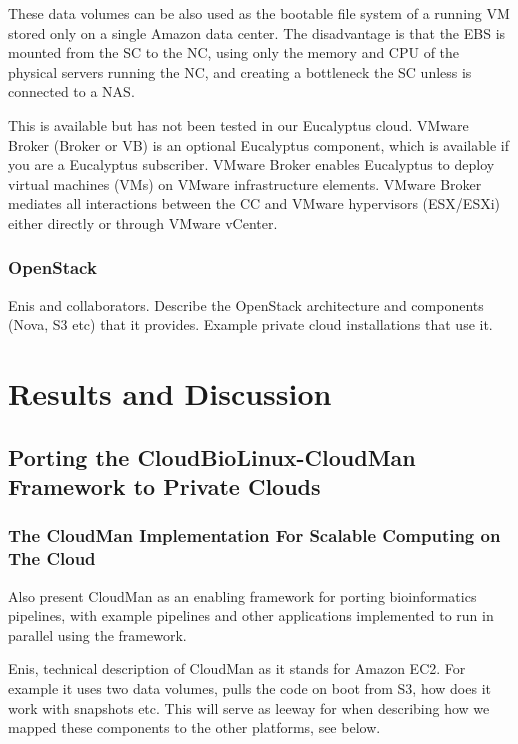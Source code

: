 \documentclass[10pt]{bmc_article}
\newenvironment{bmcformat}{\baselineskip20pt\sloppy\setboolean{publ}{false}}{\baselineskip20pt\sloppy}
\begin{document}
\begin{bmcformat}
These data volumes can be also used  as the bootable file system of a running VM stored only on a single Amazon data center. The 
disadvantage is that the EBS is mounted from the SC to the NC, using only the memory and CPU of the physical servers running the NC,
and creating a bottleneck the SC unless is connected to a NAS.




This is available but has not been tested in our Eucalyptus cloud.
VMware Broker (Broker or VB) is an optional Eucalyptus component, which is available if you are a Eucalyptus subscriber. 
VMware Broker enables Eucalyptus to deploy virtual machines (VMs) on VMware infrastructure elements. VMware Broker 
mediates all interactions between the CC and VMware hypervisors (ESX/ESXi) either directly or through VMware vCenter.

\pb


\subsubsection*{OpenStack}
Enis and collaborators. Describe the OpenStack architecture and components (Nova, S3 etc) that it provides.
Example private cloud installations that use it. \pb



\section*{Results and Discussion}


\subsection*{Porting the CloudBioLinux-CloudMan Framework to Private Clouds} 

\subsubsection*{The CloudMan Implementation For Scalable Computing on The Cloud}

Also present CloudMan as an enabling framework for porting bioinformatics pipelines, with example pipelines
and other applications implemented to run in parallel using the framework. \pb

Enis, technical description of CloudMan as it stands for Amazon EC2. For example it uses two data volumes,
pulls the code on boot from S3, how does it work with snapshots etc. This will serve as leeway for when describing
how we mapped these components to the other platforms, see below. \pb


\end{bmcformat}
\end{document}
